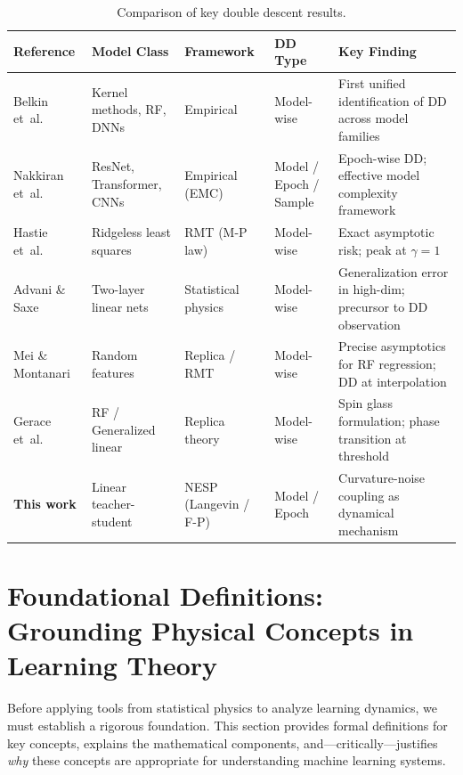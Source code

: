 \documentclass[
  journal=largetwo,
  year=2025,
  volume=37,
]{cup-journal}
\begin{document}
\begin{table}[htb]
\centering
\footnotesize
\caption{Comparison of key double descent results.}
\label{tab:dd_comparison}
\begin{tabular}{@{}p{3.2cm}p{2.8cm}p{2.8cm}p{1.8cm}p{4cm}@{}}
\toprule
\textbf{Reference} & \textbf{Model Class} & \textbf{Framework} & \textbf{DD Type} & \textbf{Key Finding} \\
\midrule
Belkin et~al.\ \cite{belkin_reconciling_2019} & Kernel methods, RF, DNNs & Empirical & Model-wise & First unified identification of DD across model families \\
\addlinespace[2pt]
Nakkiran et~al.\ \cite{nakkiran_deep_2019} & ResNet, Transformer, CNNs & Empirical (EMC) & Model / Epoch / Sample & Epoch-wise DD; effective model complexity framework \\
\addlinespace[2pt]
Hastie et~al.\ \cite{hastie2019surprises} & Ridgeless least squares & RMT (M-P law) & Model-wise & Exact asymptotic risk; peak at $\gamma=1$ \\
\addlinespace[2pt]
Advani \& Saxe \cite{advani2017highdimensionaldynamicsgeneralizationerror} & Two-layer linear nets & Statistical physics & Model-wise & Generalization error in high-dim; precursor to DD observation \\
\addlinespace[2pt]
Mei \& Montanari \cite{mei2020generalizationerrorrandomfeatures} & Random features & Replica / RMT & Model-wise & Precise asymptotics for RF regression; DD at interpolation \\
\addlinespace[2pt]
Gerace et~al.\ \cite{gerace2020generalisation} & RF / Generalized linear & Replica theory & Model-wise & Spin glass formulation; phase transition at threshold \\
\addlinespace[2pt]
\textbf{This work} & Linear teacher-student & NESP (Langevin / F-P) & Model / Epoch & Curvature-noise coupling as dynamical mechanism \\
\bottomrule
\end{tabular}
\end{table}

\section{Foundational Definitions: Grounding Physical Concepts in Learning Theory}\label{sec:foundational_defs}

Before applying tools from statistical physics to analyze learning dynamics, we must establish a rigorous foundation. This section provides formal definitions for key concepts, explains the mathematical components, and---critically---justifies \textit{why} these concepts are appropriate for understanding machine learning systems.
\end{document}
